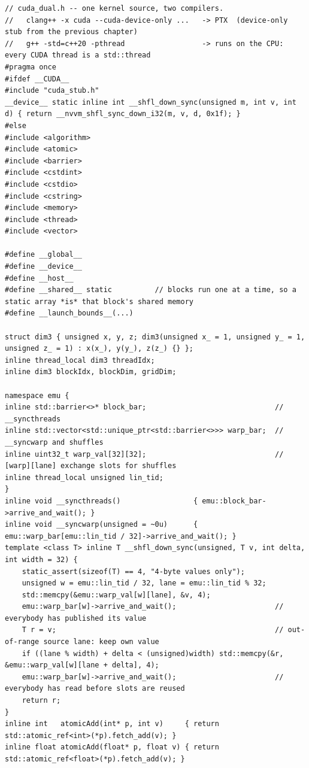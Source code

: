 \documentclass[10pt,a4paper,openany,oneside]{report}
\begin{document}
\begin{lstlisting}[language={[11]C++},basicstyle=\ttfamily\scriptsize,title={cuda\_dual.h (CPU emulation + device-only stub)}]
// cuda_dual.h -- one kernel source, two compilers.
//   clang++ -x cuda --cuda-device-only ...   -> PTX  (device-only stub from the previous chapter)
//   g++ -std=c++20 -pthread                  -> runs on the CPU: every CUDA thread is a std::thread
#pragma once
#ifdef __CUDA__
#include "cuda_stub.h"
__device__ static inline int __shfl_down_sync(unsigned m, int v, int d) { return __nvvm_shfl_sync_down_i32(m, v, d, 0x1f); }
#else
#include <algorithm>
#include <atomic>
#include <barrier>
#include <cstdint>
#include <cstdio>
#include <cstring>
#include <memory>
#include <thread>
#include <vector>

#define __global__
#define __device__
#define __host__
#define __shared__ static          // blocks run one at a time, so a static array *is* that block's shared memory
#define __launch_bounds__(...)

struct dim3 { unsigned x, y, z; dim3(unsigned x_ = 1, unsigned y_ = 1, unsigned z_ = 1) : x(x_), y(y_), z(z_) {} };
inline thread_local dim3 threadIdx;
inline dim3 blockIdx, blockDim, gridDim;

namespace emu {
inline std::barrier<>* block_bar;                              // __syncthreads
inline std::vector<std::unique_ptr<std::barrier<>>> warp_bar;  // __syncwarp and shuffles
inline uint32_t warp_val[32][32];                              // [warp][lane] exchange slots for shuffles
inline thread_local unsigned lin_tid;
}
inline void __syncthreads()                 { emu::block_bar->arrive_and_wait(); }
inline void __syncwarp(unsigned = ~0u)      { emu::warp_bar[emu::lin_tid / 32]->arrive_and_wait(); }
template <class T> inline T __shfl_down_sync(unsigned, T v, int delta, int width = 32) {
    static_assert(sizeof(T) == 4, "4-byte values only");
    unsigned w = emu::lin_tid / 32, lane = emu::lin_tid % 32;
    std::memcpy(&emu::warp_val[w][lane], &v, 4);
    emu::warp_bar[w]->arrive_and_wait();                       // everybody has published its value
    T r = v;                                                   // out-of-range source lane: keep own value
    if ((lane % width) + delta < (unsigned)width) std::memcpy(&r, &emu::warp_val[w][lane + delta], 4);
    emu::warp_bar[w]->arrive_and_wait();                       // everybody has read before slots are reused
    return r;
}
inline int   atomicAdd(int* p, int v)     { return std::atomic_ref<int>(*p).fetch_add(v); }
inline float atomicAdd(float* p, float v) { return std::atomic_ref<float>(*p).fetch_add(v); }


\end{lstlisting}
\end{document}
